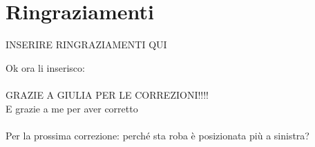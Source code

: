\chapter{Ringraziamenti}
INSERIRE RINGRAZIAMENTI QUI 

Ok ora li inserisco:\\
\\
GRAZIE A GIULIA PER LE CORREZIONI!!!!\\
E grazie a me per aver corretto\\ \\
Per la prossima correzione: perché sta roba è posizionata più a sinistra?